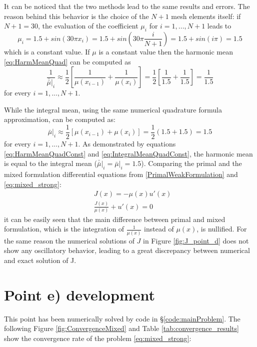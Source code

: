 \documentclass{article}
\begin{document}
It can be noticed that the two methods lead to the same results and errors.
The reason behind this behavior is the choice of the $N+1$ mesh elements itself: if $N+1 = 30$, the evaluation of the coefficient $\mu_i$ for $i=1,...,N+1$ leads to
\begin{equation}
    \mu_i = 1.5 + sin(30 \pi x_i) = 1.5 + sin\left(30 \pi \frac{i}{N+1}\right) = 1.5 + sin (i \pi) = 1.5  
    \label{eq:sinN29}
\end{equation}
which is a constant value.
If $\mu$ is a constant value then the harmonic mean \eqref{eq:HarmMeanQuad} can be computed as
\begin{equation}
    \frac{1}{\bar{\bar{\mu}}|_i} \approx \frac{1}{2} \left[ \frac{1}{\mu(x_{i-1})} + \frac{1}{\mu(x_i)} \right] = \frac{1}{2} \left[ \frac{1}{1.5} + \frac{1}{1.5}\right] = \frac{1}{1.5}
    \label{eq:HarmMeanQuadConst}
\end{equation}
for every $i = 1,...,N+1$.

While the integral mean, using the same numerical quadrature formula approximation, can be computed as:
\begin{equation}
    \bar{\mu}|_i \approx \frac{1}{2}\left[\mu(x_{i-1}) + \mu(x_i)\right] = \frac{1}{2} (1.5+1.5)=1.5 
    \label{eq:IntegralMeanQuadConst}
\end{equation}
for every $i = 1,...,N+1$.\newline
As demonstrated by equations \eqref{eq:HarmMeanQuadConst} and \eqref{eq:IntegralMeanQuadConst}, the harmonic mean is equal to the integral mean \newline (${\bar{\bar{\mu}}|_i }= \bar{\mu}|_i = 1.5$). \newline
Comparing the primal and the mixed formulation differential equations from \eqref{PrimalWeakFormulation} and \eqref{eq:mixed_strong}:
\begin{align}
    & J(x) = -\mu(x) u'(x)\\
    & \frac{J(x)}{\mu(x)} +u'(x) = 0
\end{align}
it can be easily seen that the main difference between primal and mixed formulation, which is the integration of $\frac{1}{\mu(x)}$ instead of $\mu(x)$, is nullified.  
For the same reason the numerical solutions of $J$ in Figure \ref{fig:J_point_d} does not show any oscillatory behavior, leading to a great discrepancy between numerical and exact solution of J.

\newpage


\section{Point e) development}
This point has been numerically solved by code in \S \ref{code:mainProblem}.
The following Figure \ref{fig:ConvergenceMixed} and Table \ref{tab:convergence_results} show the convergence rate of the problem \eqref{eq:mixed_strong}:
\end{document}
